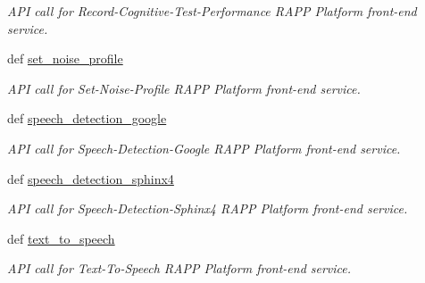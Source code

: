 \begin{DoxyCompactItemize}
\begin{DoxyCompactList}\small\item\em A\-P\-I call for Record-\/\-Cognitive-\/\-Test-\/\-Performance R\-A\-P\-P Platform front-\/end service. \end{DoxyCompactList}\item 
def \hyperlink{classRappCloud_1_1RappCloud_1_1RappCloud_a3c25548dc4fb730ee4988073ccaa730a}{set\-\_\-noise\-\_\-profile}
\begin{DoxyCompactList}\small\item\em A\-P\-I call for Set-\/\-Noise-\/\-Profile R\-A\-P\-P Platform front-\/end service. \end{DoxyCompactList}\item 
def \hyperlink{classRappCloud_1_1RappCloud_1_1RappCloud_a10caf8c212c903995a7ae5a8bb1965d6}{speech\-\_\-detection\-\_\-google}
\begin{DoxyCompactList}\small\item\em A\-P\-I call for Speech-\/\-Detection-\/\-Google R\-A\-P\-P Platform front-\/end service. \end{DoxyCompactList}\item 
def \hyperlink{classRappCloud_1_1RappCloud_1_1RappCloud_a74952a602245edad07cecc5d94923624}{speech\-\_\-detection\-\_\-sphinx4}
\begin{DoxyCompactList}\small\item\em A\-P\-I call for Speech-\/\-Detection-\/\-Sphinx4 R\-A\-P\-P Platform front-\/end service. \end{DoxyCompactList}\item 
def \hyperlink{classRappCloud_1_1RappCloud_1_1RappCloud_ab4f3cfb7321b9cf6dd126f53ff9a20ab}{text\-\_\-to\-\_\-speech}
\begin{DoxyCompactList}\small\item\em A\-P\-I call for Text-\/\-To-\/\-Speech R\-A\-P\-P Platform front-\/end service. \end{DoxyCompactList}\end{DoxyCompactItemize}
